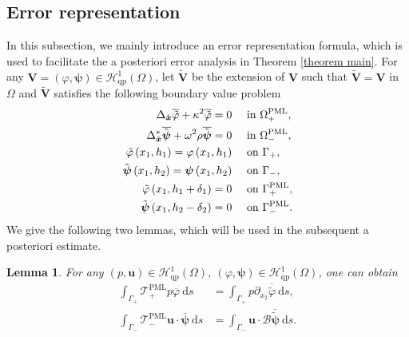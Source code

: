 \documentclass[final,3p,times]{elsarticle}
\newtheorem{lemma}{Lemma}
\begin{document}
\subsection{Error representation}
In this subsection, we mainly introduce an error representation formula, which is used to facilitate the a posteriori error analysis in Theorem \ref{theorem main}. For any $\boldsymbol{V}=(\varphi,\boldsymbol{\psi}) \in \mathscr{H}^1_\mathrm{qp}\left(\Omega\right)$,  let $\tilde{\boldsymbol{V}}$ be the extension of $\boldsymbol{V}$ such that $\tilde{\boldsymbol{V}}=\boldsymbol{V}$ in $\Omega$ and $\tilde{\boldsymbol{V}}$ satisfies the following boundary value problem
\begin{align}\label{extenstion}
	\Delta_{\hat{\boldsymbol{x}}}  \overline{\tilde{\varphi}} + \kappa^2 \overline{\tilde{\varphi}}=0 & \quad\text { in } \Omega_+^{\mathrm{PML}}, \notag\\
	\Delta^*_{\hat{\boldsymbol{x}}}\overline{\tilde{\boldsymbol{\psi}}} +  \omega^2\rho \overline{\tilde{\boldsymbol{\psi}}} = 0 &\quad \text { in } \Omega^{\mathrm{PML}}_-, \notag\\
	\tilde{\varphi}\left(x_1, h_1\right)=\varphi\left(x_1, h_1\right) & \quad \text { on } \Gamma_+, \\
	\tilde{\boldsymbol{\psi}}\left(x_1, h_2\right)=\boldsymbol{\psi} \left(x_1, h_2\right) & \quad\text { on } \Gamma_-, \notag\\
	\tilde{\varphi}\left(x_1, h_1+\delta_1\right)=0 &\quad \text { on } \Gamma_+^{\mathrm{PML}},\notag \\
	\tilde{\boldsymbol{\psi}}\left(x_1, h_2-\delta_2\right)=0 &\quad \text { on } \Gamma_-^{\mathrm{PML}}.\notag
\end{align}
We give the following two lemmas, which will be used in the subsequent a posteriori estimate.
\begin{lemma}\label{lemma5}
	For any $(p,\boldsymbol{u}) \in \mathscr{H}^1_\mathrm{qp}\left(\Omega\right)$, $(\varphi, \boldsymbol{\psi}) \in \mathscr{H}^1_\mathrm{qp}\left(\Omega\right)$, one can obtain
	\begin{align*}
		\int_{\Gamma_+} \mathscr{T}_+^{\mathrm{PML}} p  \overline{\varphi} \mathrm{~d} s &=\int_{\Gamma_+} p  \partial_{x_2} \overline{\tilde{\varphi}} \mathrm{~d} s,\\
		\int_{\Gamma_-} \mathscr{T}_-^{\mathrm{PML}} \boldsymbol{u} \cdot \overline{\boldsymbol{\psi}} \mathrm{~d} s &=\int_{\Gamma_-} \boldsymbol{u} \cdot \mathscr{B} \overline{\tilde{\boldsymbol{\psi}}} \mathrm{~d} s.
	\end{align*}
\end{lemma}
\end{document}
